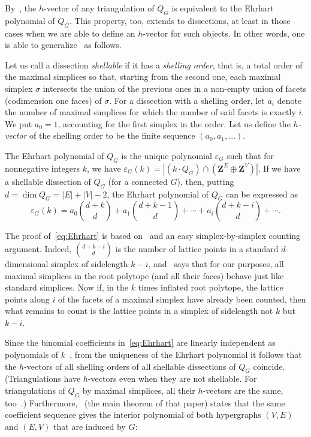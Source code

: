 \documentclass[10pt]{amsart}
\theoremstyle{definition}\newtheorem{defi}[theo]{Definition}
\theoremstyle{remark}\newtheorem{rema}[theo]{Remark}
\newcommand{\Z}{\mathbf{Z}}
\begin{document}
By~\cite[Theorem~3.10]{KP_Ehrhart}, the $h$-vector of any triangulation of $Q_G$ is equivalent to the Ehrhart polynomial of $Q_G$. This property, too, extends to dissections, at least in those cases when we are able to define an $h$-vector for such objects. In other words, one is able to generalize~\cite[Remark~3.12]{KP_Ehrhart} as follows.

Let us call a dissection \emph{shellable} if it has a \emph{shelling order}, that is, a total order of the maximal simplices so that, starting from the second one, each maximal simplex $\sigma$ intersects the union of the previous ones in a non-empty union of facets (codimension one faces) of $\sigma$. For a dissection with a shelling order, let $a_i$ denote the number of maximal simplices for which the number of said facets is exactly $i$. We put $a_0=1$, accounting for the first simplex in the order. Let us define the \emph{$h$-vector} of the shelling order to be the finite sequence $(a_0,a_1,\ldots)$.

The Ehrhart polynomial of $Q_G$ is the unique polynomial $\varepsilon_G$ such that for nonnegative integers $k$, we have $\varepsilon_{G}(k)=|(k\cdot Q_G)\cap(\Z^E\oplus\Z^V)|$. If we have a shellable dissection of $Q_G$ (for a connected $G$), then, putting $d=\dim Q_G=|E|+|V|-2$, the Ehrhart polynomial of $Q_G$ can be expressed as 
\begin{equation}
\label{eq:Ehrhart}
\varepsilon_{G}(k)=a_0\binom{d+k}{d}+a_1\binom{d+k-1}{d}+\cdots+a_i\binom{d+k-i}{d}+\cdots.
\end{equation}

The proof of~\eqref{eq:Ehrhart} is based on~\cite[Lemma~3.3]{KP_Ehrhart} and an easy simplex-by-simplex counting argument. Indeed, $\binom{d+k-i}{d}$ is the number of lattice points in a standard $d$-dimensional simplex of sidelength $k-i$, and~\cite[Lemma~3.3]{KP_Ehrhart} says that for our purposes, all maximal simplices in the root polytope (and all their faces) behave just like standard simplices. Now if, in the $k$ times inflated root polytope, the lattice points along $i$ of the facets of a maximal simplex have already been counted, then what remains to count is the lattice points in a simplex of sidelength not $k$ but $k-i$.

Since the binomial coefficients in~\eqref{eq:Ehrhart} are linearly independent as polynomials of $k$~\cite[Lemma~3.8]{KP_Ehrhart}, from the uniqueness of the Ehrhart polynomial it follows that the $h$-vectors of all shelling orders of all shellable dissections of $Q_G$ coincide. (Triangulations have $h$-vectors even when they are not shellable. For triangulations of $Q_G$ by maximal simplices, all their $h$-vectors are the same, too~\cite[Theorem~3.10]{KP_Ehrhart}.) Furthermore,~\cite[Equation~(5.1)]{KP_Ehrhart} (the main theorem of that paper) states that the same coefficient sequence gives the interior polynomial of both hypergraphs $(V,E)$ and $(E,V)$ that are induced by $G$:
\end{document}
